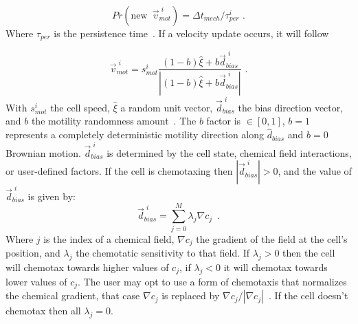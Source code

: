 \begin{equation}\label{eq:abm:physi:change-vmot}
    Pr(\text{new}\,\,\,\Vec{v}^{\,\,i}_{mot}) = \Delta t_{mech} / \tau^i_{per}\,\,.
\end{equation}
\noindent Where $\tau_{per}$ is the persistence time~\cite{ghaffarizadeh_physicell_2018}. If a velocity update occurs, it will follow

\begin{equation}
    \Vec{v}^{\,\,i}_{mot} = s^i_{mot} \frac{\left(1 - b\right) \hat{\xi} + b \Vec{d}^{\,\,i}_{bias}}{|\left(1 - b\right) \hat{\xi} + b \Vec{d}^{\,\,i}_{bias}|}\,\,.
\end{equation}
\noindent With $s^i_{mot}$ the cell speed, $\hat{\xi}$ a random unit vector, $\Vec{d}^{\,\,i}_{bias}$ the bias direction vector, and $b$ the motility randomness amount~\cite{ghaffarizadeh_physicell_2018}. The $b$ factor  is $\in[0, 1]$, $b=1$ represents a completely deterministic motility direction along $\hat{d}_{bias}$ and $b=0$ Brownian motion. $\Vec{d}^{\,\,i}_{bias}$ is determined by the cell state, chemical field interactions, or user-defined factors. If the cell is chemotaxing then $|\Vec{d}^{\,\,i}_{bias}| > 0$, and the value of $\Vec{d}^{\,\,i}_{bias}$ is given by:
\begin{equation}\label{eq:abm:physi:dbias}
    \Vec{d}^{\,\,i}_{bias} = \sum_{j=0}^M \lambda_j \nabla c_j \,\,\,.%
\end{equation}
\noindent Where $j$ is the index of a chemical field, $\nabla c_j$ the gradient of the field at the cell's position, and $\lambda_j$ the chemotatic sensitivity to that field. If $\lambda_j>0$ then the cell will chemotax towards higher values of $c_j$, if $\lambda_j<0$ it will chemotax towards lower values of $c_j$. The user may opt to use a form of chemotaxis that normalizes the chemical gradient, that case $\nabla c_j $ is replaced by $\nabla c_j / |\nabla c_j |$~\cite{ghaffarizadeh_physicell_2018}. If the cell doesn't chemotax then all $\lambda_j=0$.



